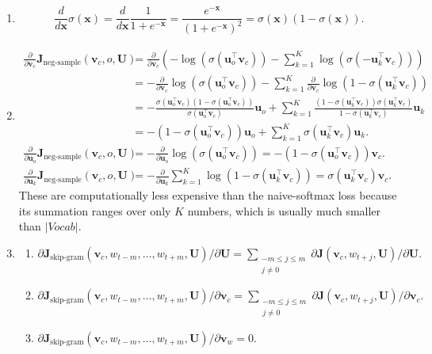 \documentclass[12pt, dvipdfmx]{article}
\begin{document}
\begin{enumerate}[label=\textbf{\arabic*}]
\begin{enumerate}[label=(\alph*)]
\item \[\frac{d}{d\bm{x}}\sigma(\bm{x})=\frac{d}{d\bm{x}}\frac{1}{1+e^{-\bm{x}}}=\frac{e^{-\bm{x}}}{(1+e^{-\bm{x}})^2}=\sigma(\bm{x})(1-\sigma(\bm{x})).\]
\item \begin{align*} \frac{\partial}{\partial\bm{v}_c}\bm{J}_{\textrm{neg-sample}}(\bm{v}_c,o,\bm{U}) &=\frac{\partial}{\partial\bm{v}_c}\left(-\log(\sigma(\bm{u}_o^\top\bm{v}_c))-\sum_{k=1}^K\log(\sigma(-\bm{u}_k^\top\bm{v}_c))\right) \\
&=-\frac{\partial}{\partial\bm{v}_c}\log(\sigma(\bm{u}_o^\top\bm{v}_c))-\sum_{k=1}^K\frac{\partial}{\partial\bm{v}_c}\log(1-\sigma(\bm{u}_k^\top\bm{v}_c)) \\
&=-\frac{\sigma(\bm{u}_o^\top\bm{v}_c)(1-\sigma(\bm{u}_o^\top\bm{v}_c))}{\sigma(\bm{u}_o^\top\bm{v}_c)}\bm{u}_o+\sum_{k=1}^K\frac{(1-\sigma(\bm{u}_k^\top\bm{v}_c))\sigma(\bm{u}_k^\top\bm{v}_c)}{1-\sigma(\bm{u}_k^\top\bm{v}_c)}\bm{u}_k \\
&=-(1-\sigma(\bm{u}_o^\top\bm{v}_c))\bm{u}_o+\sum_{k=1}^K\sigma(\bm{u}_k^\top\bm{v}_c)\bm{u}_k. \\
\frac{\partial}{\partial\bm{u}_o}\bm{J}_{\textrm{neg-sample}}(\bm{v}_c,o,\bm{U}) &=-\frac{\partial}{\partial\bm{u}_o}\log(\sigma(\bm{u}_o^\top\bm{v}_c))=-(1-\sigma(\bm{u}_o^\top\bm{v}_c))\bm{v}_c.\\
\frac{\partial}{\partial\bm{u}_k}\bm{J}_{\textrm{neg-sample}}(\bm{v}_c,o,\bm{U}) &=-\frac{\partial}{\partial\bm{u}_k}\sum_{k=1}^K\log(1-\sigma(\bm{u}_k^\top\bm{v}_c))=\sigma(\bm{u}_k^\top\bm{v}_c)\bm{v}_c.
\end{align*}
These are computationally less expensive than the naive-softmax loss because its summation ranges over only $K$ numbers, which is usually much smaller than $|Vocab|$.
\item \begin{enumerate}[label=(\roman*)]
  \item $\partial\bm{J}_{\textrm{skip-gram}}(\bm{v}_c,w_{t-m},\ldots,w_{t+m},\bm{U})/\partial\bm{U}=\sum\limits_{\substack{-m\leq j\leq m\\j\neq 0}}\partial\bm{J}(\bm{v}_c,w_{t+j},\bm{U})/\partial\bm{U}.$
  \item $\partial\bm{J}_{\textrm{skip-gram}}(\bm{v}_c,w_{t-m},\ldots,w_{t+m},\bm{U})/\partial\bm{v}_c=\sum\limits_{\substack{-m\leq j\leq m\\j\neq 0}}\partial\bm{J}(\bm{v}_c,w_{t+j},\bm{U})/\partial\bm{v}_c.$
  \item $\partial\bm{J}_{\textrm{skip-gram}}(\bm{v}_c,w_{t-m},\ldots,w_{t+m},\bm{U})/\partial\bm{v}_w=0.$

\end{enumerate}
\end{enumerate}
\end{enumerate}
\end{document}
